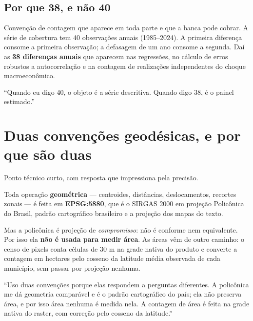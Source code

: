 \section{Por que 38, e não 40}

Convenção de contagem que aparece em toda parte e que a banca pode cobrar. A
série de cobertura tem 40 observações anuais (1985--2024). A primeira diferença
consome a primeira observação; a defasagem de um ano consome a segunda. Daí as
\textbf{38 diferenças anuais} que aparecem nas regressões, no cálculo de erros
robustos a autocorrelação e na contagem de realizações independentes do choque
macroeconômico.

\begin{nabanca}
``Quando eu digo 40, o objeto é a série descritiva. Quando digo 38, é o painel
estimado.''
\end{nabanca}

\chapter{Duas convenções geodésicas, e por que são duas}

Ponto técnico curto, com resposta que impressiona pela precisão.

Toda operação \textbf{geométrica} --- centroides, distâncias, deslocamentos,
recortes zonais --- é feita em \textbf{EPSG:5880}, que é o SIRGAS 2000 em
projeção Policônica do Brasil, padrão cartográfico brasileiro e a projeção dos
mapas do texto.

Mas a policônica é projeção de \emph{compromisso}: não é conforme nem
equivalente. Por isso ela \textbf{não é usada para medir área}. As áreas vêm de
outro caminho: o censo de pixels conta células de 30 m na grade nativa do
produto e converte a contagem em hectares pelo cosseno da latitude média
observada de cada município, sem passar por projeção nenhuma.

\begin{nabanca}
``Uso duas convenções porque elas respondem a perguntas diferentes. A policônica
me dá geometria comparável e é o padrão cartográfico do país; ela não preserva
área, e por isso área nenhuma é medida nela. A contagem de área é feita na grade
nativa do raster, com correção pelo cosseno da latitude.''
\end{nabanca}

